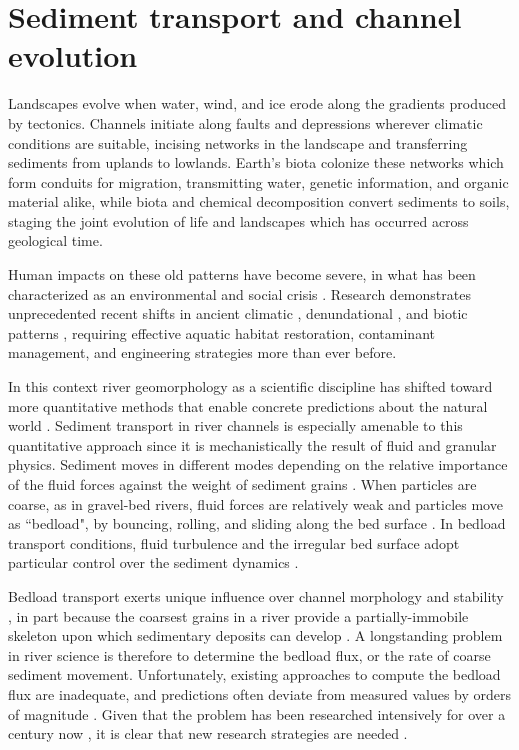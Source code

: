 
\chapter{Sediment transport and channel evolution}
\label{ch:Introduction}

Landscapes evolve when water, wind, and ice erode along the gradients produced by tectonics.
Channels initiate along faults and depressions wherever climatic conditions are suitable, incising networks in the landscape and transferring sediments from uplands to lowlands.
Earth's biota colonize these networks which form conduits for migration, transmitting water, genetic information, and organic material alike, while biota and chemical decomposition convert sediments to soils, staging the joint evolution of life and landscapes which has occurred across geological time.

Human impacts on these old patterns have become severe, in what has been characterized as an environmental and social crisis \citep{Slaymaker2021}.
Research demonstrates unprecedented recent shifts in ancient climatic \citep{Sivan2004,Slater2021}, denundational \citep{Hooke2000,Szabo2010}, and biotic patterns \citep{Walther2002,Willis2009}, requiring effective aquatic habitat restoration, contaminant management, and engineering strategies more than ever before.

In this context river geomorphology as a scientific discipline has shifted toward more quantitative methods that enable concrete predictions about the natural world \citep{Church2005,Church2010}.
Sediment transport in river channels is especially amenable to this quantitative approach since it is mechanistically the result of fluid and granular physics.
Sediment moves in different modes depending on the relative importance of the fluid forces against the weight of sediment grains \citep{Bagnold1956}.
When particles are coarse, as in gravel-bed rivers, fluid forces are relatively weak and particles move as ``bedload", by bouncing, rolling, and sliding along the bed surface \citep{Kalinske1947}.
In bedload transport conditions, fluid turbulence and the irregular bed surface adopt particular control over the sediment dynamics \citep{Ferreira2015}.

Bedload transport exerts unique influence over channel morphology and stability \citep{Church2006,Recking2016}, in part because the coarsest grains in a river provide a partially-immobile skeleton upon which sedimentary deposits can develop \citep{Hassan2008, Eaton2020}.
A longstanding problem in river science is therefore to determine the bedload flux, or the rate of coarse sediment movement.
Unfortunately, existing approaches to compute the bedload flux are inadequate, and predictions often deviate from measured values by orders of magnitude \citep{Gomez1989, Barry2004, Bathurst2007a, Recking2012}.
Given that the problem has been researched intensively for over a century now \citep{Gilbert1914}, it is clear that new research strategies are needed \citep{Ancey2020}.


